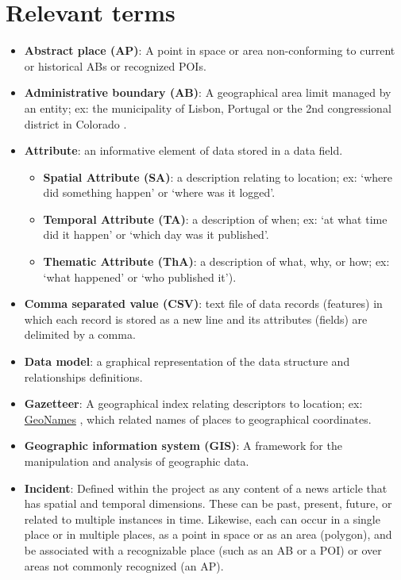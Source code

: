 \section{Relevant terms} \label{appendix:terms}
\begin{itemize}
	\item[] \textbf{Abstract place (AP)}: A point in space or area non-conforming to current or historical ABs or recognized POIs.
	\item[] \textbf{Administrative boundary (AB)}: A geographical area limit managed by an entity; ex: the municipality of Lisbon, Portugal or the 2nd congressional district in Colorado .
	\item[] \textbf{Attribute}: an informative element of data stored in a data field. 
	\begin{itemize}
		\item[] \textbf{Spatial Attribute (SA)}: a description relating to location; ex: ‘where did something happen’ or ‘where was it logged’.
		\item[] \textbf{Temporal Attribute (TA)}: a description of when; ex: ‘at what time did it happen’ or ‘which day was it published’. 
		\item[] \textbf{Thematic Attribute (ThA)}: a description of what, why, or how; ex: ‘what happened’ or ‘who published it’).
	\end{itemize}
	\item[] \textbf{Comma separated value (CSV)}: text file of data records (features) in which each record is stored as a new line and its attributes (fields) are delimited by a comma.
	\item[] \textbf{Data model}: a graphical representation of the data structure and relationships definitions.
	\item[] \textbf{Gazetteer}: A geographical index relating descriptors to location; ex: \href{https://www.geonames.org/}{GeoNames} , which related names of places to geographical coordinates.
	\item[] \textbf{Geographic information system (GIS)}: A framework for the manipulation and analysis of geographic data.
	\item[] \textbf{Incident}: Defined within the project as any content of a news article that has spatial and temporal dimensions.  These can be past, present, future, or related to multiple instances in time. Likewise, each can occur in a single place or in multiple places, as a point in space or as an area (polygon), and be associated with a recognizable place (such as an AB or a POI) or over areas not commonly recognized (an AP).

\end{itemize}
